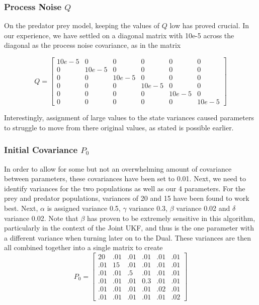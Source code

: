\subsubsection{Process Noise $Q$}
On the predator prey model, keeping the values of $Q$ low has proved crucial. In our experience, we have settled on a diagonal matrix with 10e-5 across the diagonal as the process noise covariance, as in the matrix

$$Q = \begin{bmatrix}
10e-5 & 0 & 0 & 0 & 0 & 0\\
0 & 10e-5 & 0 & 0 & 0 & 0\\
0 & 0 & 10e-5 & 0 & 0 & 0\\
0 & 0 & 0 & 10e-5 & 0 & 0\\
0 & 0 & 0 & 0  & 10e-5 & 0\\
0 & 0 & 0 & 0 & 0 & 10e-5\end{bmatrix}$$

Interestingly, assignment of large values to the state variances caused parameters to struggle to move from there original values, as stated is possible earlier. 

\subsubsection{Initial Covariance $P_0$}
In order to allow for some but not an overwhelming amount of covariance between parameters, these covariances have been set to 0.01. Next, we need to identify variances for the two populations as well as our 4 parameters. For the prey and predator populations, variances of 20 and 15 have been found to work best. Next, $\alpha$ is assigned variance 0.5, $\gamma$ variance 0.3, $\beta$ variance 0.02 and $\delta$ variance 0.02. Note that $\beta$ has proven to be extremely sensitive in this algorithm, particularly in the context of the Joint UKF, and thus is the one parameter with a different variance when turning later on to the Dual. These variances are then all combined together into a single matrix to create
$$P_{0} = \begin{bmatrix}
20 & .01 & .01 & .01 & .01 & .01\\
.01 & 15 & .01 & .01 & .01 & .01\\
.01 & .01 & .5 & .01 & .01 & .01\\
.01 & .01 & .01 & 0.3 & .01 & .01\\
.01 & .01 & .01 & .01  & .02 & .01\\
.01 & .01 & .01 & .01 & .01 & .02\end{bmatrix}$$


